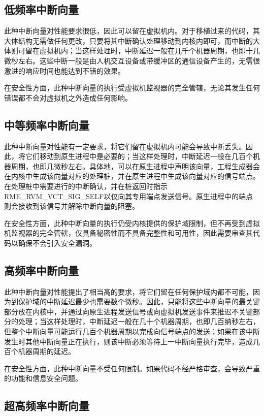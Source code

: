 \subsection{低频率中断向量}\label{subsec:6-3-1}

此种中断向量对性能要求很低，因此可以留在虚拟机内。对于移植过来的代码，其大体结构无需做任何更改，只要将其中断确认处理移动到内核内即可，而中断的大体则可留在虚拟机内；当这样处理时，中断延迟一般在几千个机器周期，也即十几微秒左右。这些中断一般是由人机交互设备或带缓冲区的通信设备产生的，无需很激进的响应时间也能达到不错的效果。

在安全性方面，此种中断向量的执行受虚拟机监视器的完全管辖，无论其发生任何错误都不会对虚拟机之外造成任何影响。

\subsection{中等频率中断向量}\label{subsec:6-3-2}

此种中断向量对性能有一定要求，将它们留在虚拟机内可能会导致中断丢失。因此，将它们移动到原生进程中是必要的；当这样处理时，中断延迟一般在几百个机器周期，也即几微秒左右。具体地，可以在原生进程中声明该向量，工程生成器会在内核中生成该向量对应的处理桩，并在原生进程中生成该向量对应的信号端点。在处理桩中需要进行的中断确认，并在桩返回时指示RME\_RVM\_VCT\_SIG\_SELF以仅向其专用端点发送信号。原生进程中的端点则会接收到该信号并解除中断向量的阻塞。

在安全性方面，此种中断向量的执行仍受内核提供的保护域限制，但不再受到虚拟机监视器的完全管辖，仅具备秘密性而不具备完整性和可用性，因此需要审查其代码以确保不会引入安全漏洞。

\subsection{高频率中断向量}\label{subsec:6-3-3}

此种中断向量对性能提出了相当高的要求，将它们留在任何保护域内都不可能，因为到保护域的中断延迟最少也需要数个微秒。因此，只能将这些中断向量的最关键部分放在内核中，并通过向原生进程发送信号或向虚拟机发送事件来推迟不关键部分的处理；当这样处理时，中断延迟一般在几十个机器周期，也即几百纳秒左右，但整个中断向量可能运行几百个机器周期以完成向信号端点的发送；如果在该中断发生时其他中断向量正在执行，则该中断必须等待上一中断向量执行完毕，造成几百个机器周期的延迟。

在安全性方面，此种中断向量不受任何限制。如果代码不经严格审查，会导致严重的功能和信息安全问题。

\subsection{超高频率中断向量}\label{subsec:6-3-4}

